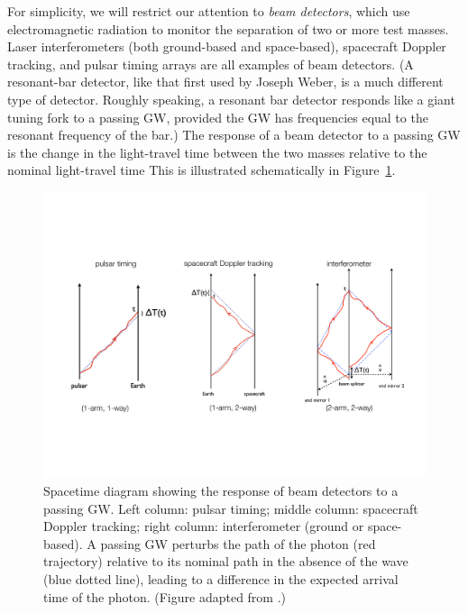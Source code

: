 For simplicity, we will restrict our attention to 
{\em beam detectors}, which use electromagnetic radiation
to monitor the separation of two or more test masses.
Laser interferometers (both ground-based and space-based),
spacecraft Doppler tracking, and pulsar timing arrays
are all examples of beam detectors.
(A resonant-bar detector, like that first used by
Joseph Weber, is a much different type of detector.
Roughly speaking, a resonant bar detector responds
like a giant tuning fork to a passing GW, provided
the GW has frequencies equal to the resonant frequency 
of the bar.)
The response of a beam detector to a passing GW is 
the change in the light-travel time between the two 
masses relative to the nominal light-travel time
This is illustrated schematically in Figure~\ref{f:beam_detectors}.
%
\begin{figure}[htbp!]
\begin{center}
\includegraphics[width=\textwidth]{Figures/beam_detectors}
\caption{Spacetime diagram showing the response of beam
detectors to a passing GW.  
Left column: pulsar timing; middle column: spacecraft Doppler
tracking; right column: interferometer (ground or space-based).
A passing GW perturbs the path of the photon (red trajectory) 
relative to its nominal path in the absence of the wave 
(blue dotted line), leading to a 
difference in the expected arrival time of the photon.
(Figure adapted from \cite{Romano-Cornish:2017}.)}
\label{f:beam_detectors}
\end{center}
\end{figure}
%

